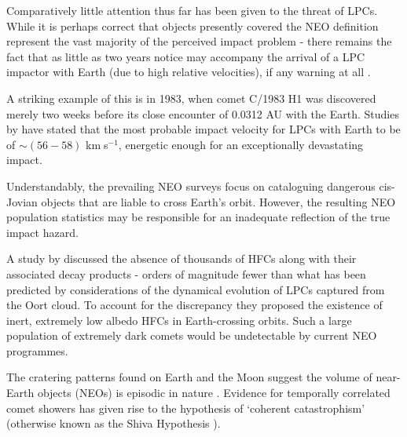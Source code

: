 
Comparatively little attention thus far has been given to the threat of LPCs. While it is perhaps correct that objects presently covered the NEO definition represent the vast majority of the perceived impact problem - there remains the fact that as little as two years notice may accompany the arrival of a LPC impactor with Earth (due to high relative velocities), if any warning at all \citep{1994hdtc.conf..221M}. 

A striking example of this is in 1983, when comet C/1983 H1 was discovered merely two weeks before its close encounter of 0.0312 AU with the Earth. %
Studies by \cite{1997NYASA.822...67W} have stated that the most probable impact velocity for LPCs with Earth to be of $\sim (56-58)$ km$\;$s$^{-1}$, energetic enough for an exceptionally devastating impact.

Understandably, the prevailing NEO surveys focus on cataloguing dangerous cis-Jovian objects that are liable to cross Earth's orbit. However, the resulting NEO population statistics may be responsible for an inadequate reflection of the true impact hazard.

A study by \cite{2004MNRAS.355..191N} discussed the absence of thousands of HFCs along with their associated decay products - orders of magnitude fewer than what has been predicted by considerations of the dynamical evolution of LPCs captured from the Oort cloud. To account for the discrepancy they proposed the existence of inert, extremely low albedo HFCs in Earth-crossing orbits. Such a large population of extremely dark comets would be undetectable by current NEO programmes.

The cratering patterns found on Earth and the Moon suggest the volume of near-Earth objects (NEOs) is episodic in nature \citep{1998ncdb.conf...21N, 1979Natur.282..455N}. Evidence for temporally correlated comet showers has given rise to the hypothesis of `coherent catastrophism' (otherwise known as the Shiva Hypothesis \citep{Rampino1996}).

